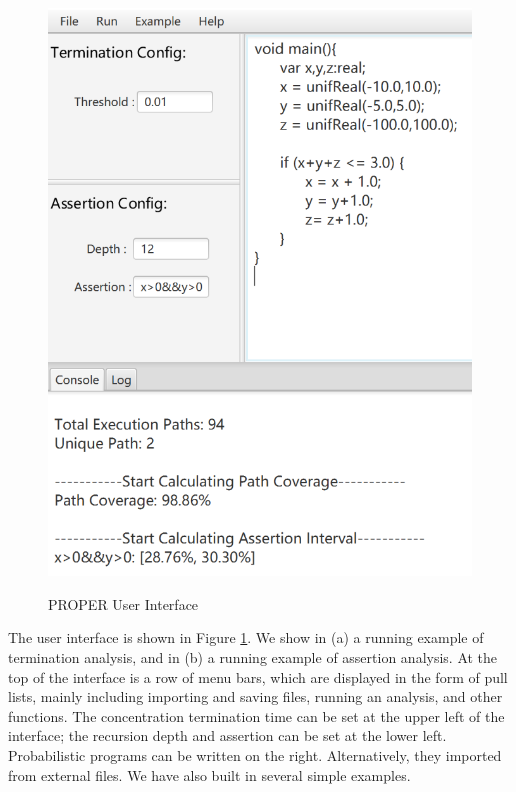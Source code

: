 \documentclass[runningheads]{llncs}
\begin{document}
\begin{figure}[htbp]
{		\includegraphics[scale=0.47]{img/interface2} 
	}
	\caption{PROPER User Interface} %
	\label{interface} %
\end{figure}
The user interface is shown in Figure \ref{interface}. We show in (a) a running example of termination analysis, and in (b) a running example of assertion analysis. At the top of the interface is a row of menu bars, which are displayed in the form of pull lists, mainly including importing and saving files, running an analysis, and other functions. The concentration termination time can be set at the upper left of the interface; the recursion depth and assertion can be set at the lower left. Probabilistic programs can be written on the right. Alternatively, they imported from external files. We have also built in several simple examples. %
\end{document}
